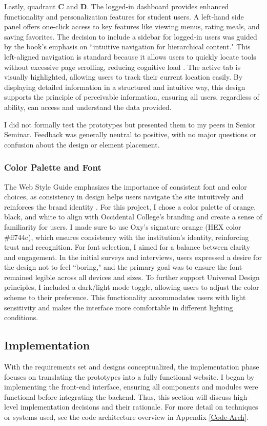 \documentclass[10pt,twocolumn]{article}
\begin{document}
Lastly, quadrant \textbf{C} and \textbf{D}. The logged-in dashboard provides enhanced functionality and personalization features for student users. A left-hand side panel offers one-click access to key features like viewing menus, rating meals, and saving favorites. The decision to include a sidebar for logged-in users  was guided by the book's emphasis on ``intuitive navigation for hierarchical content." This left-aligned navigation is standard because it allows users to quickly locate tools without excessive page scrolling, reducing cognitive load \cite{Web2009}. The active tab is visually highlighted, allowing users to track their current location easily. By displaying detailed information in a structured and intuitive way, this design supports the principle of perceivable information, ensuring all users, regardless of ability, can access and understand the data provided.

I did not formally test the prototypes but presented them to my peers in Senior Seminar. Feedback was generally neutral to positive, with no major questions or confusion about the design or element placement.

\subsubsection{Color Palette and Font}

The Web Style Guide emphasizes the importance of consistent font and color choices, as consistency in design helps users navigate the site intuitively and reinforces the brand identity \cite{Web2009}. For this project, I chose a color palette of orange, black, and white to align with Occidental College's branding and create a sense of familiarity for users. I made sure to use Oxy's signature orange (HEX color \#ff744c), which ensures consistency with the institution's identity, reinforcing trust and recognition. For font selection, I aimed for a balance between clarity and engagement. In the initial surveys and interviews, users expressed a desire for the design not to feel ``boring," and the primary goal was to ensure the font remained legible across all devices and sizes. To further support Universal Design principles, I included a dark/light mode toggle, allowing users to adjust the color scheme to their preference. This functionality accommodates users with light sensitivity and makes the interface more comfortable in different lighting conditions.

\subsection{Implementation}
With the requirements set and designs conceptualized, the implementation phase focuses on translating the prototypes into a fully functional website. I began by implementing the front-end interface, ensuring all components and modules were functional before integrating the backend. Thus, this section will discuss high-level implementation decisions and their rationale. For more detail on techniques or systems used, see the code architecture overview in Appendix \ref{Code-Arch}.
\end{document}
